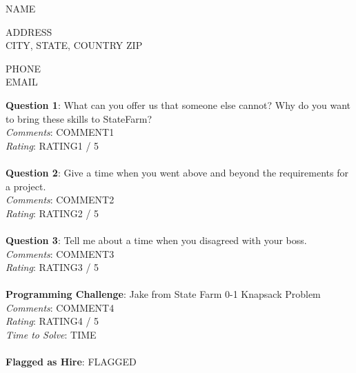 \documentclass[12pt]{article}
\begin{document}
{\LARGE \begin{center}{NAME}\end{center}}

\begin{multicols}{2}
\noindent
{ADDRESS} \\
{CITY}, {STATE}, {COUNTRY} {ZIP}
\columnbreak

\noindent
{PHONE} \\
{EMAIL}
\end{multicols}

\noindent
\textbf{Question 1}: What can you offer us that someone else cannot? Why do you want to bring these skills to StateFarm?
\\\noindent
\textit{Comments}: {COMMENT1}
\\\noindent
\textit{Rating}: {RATING1} / 5
\\\\
\noindent
\textbf{Question 2}: Give a time when you went above and beyond the requirements for a project.
\\\noindent
\textit{Comments}: {COMMENT2}
\\\noindent
\textit{Rating}: {RATING2} / 5
\\\\
\noindent
\textbf{Question 3}: Tell me about a time when you disagreed with your boss.
\\\noindent
\textit{Comments}: {COMMENT3}
\\\noindent
\textit{Rating}: {RATING3} / 5
\\\\
\noindent
\textbf{Programming Challenge}: Jake from State Farm 0-1 Knapsack Problem
\\\noindent
\textit{Comments}: {COMMENT4}
\\\noindent
\textit{Rating}: {RATING4} / 5
\\\noindent
\textit{Time to Solve}: {TIME}
\\\\
\textbf{Flagged as Hire}: {FLAGGED}
\\\\ 
\end{document}
